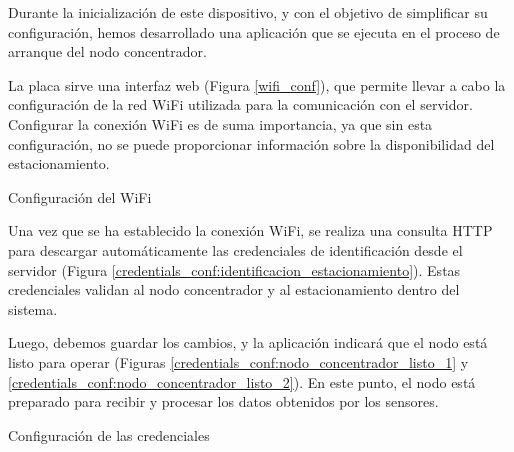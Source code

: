 Durante la inicialización de este dispositivo, y con el objetivo de simplificar su configuración, hemos desarrollado una aplicación que se ejecuta en el proceso de arranque del nodo concentrador.

La placa sirve una interfaz web (Figura \ref{wifi_conf}), que permite llevar a cabo la configuración de la red WiFi utilizada para la comunicación con el servidor. Configurar la conexión WiFi es de suma importancia, ya que sin esta configuración, no se puede proporcionar información sobre la disponibilidad del estacionamiento.

\begin{images}[\label{wifi_conf}]{Configuración del WiFi}
    \end{images}

Una vez que se ha establecido la conexión WiFi, se realiza una consulta HTTP para descargar automáticamente las credenciales de identificación desde el servidor (Figura \ref{credentials_conf:identificacion_estacionamiento}). Estas credenciales validan al nodo concentrador y al estacionamiento dentro del sistema.

Luego, debemos guardar los cambios, y la aplicación indicará que el nodo está listo para operar (Figuras \ref{credentials_conf:nodo_concentrador_listo_1} y \ref{credentials_conf:nodo_concentrador_listo_2}). En este punto, el nodo está preparado para recibir y procesar los datos obtenidos por los sensores.


\begin{images}[\label{credentials_conf}]{Configuración de las credenciales}
\end{images}


